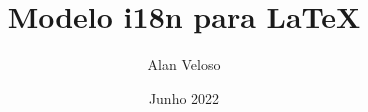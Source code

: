 \title{Modelo i18n para \LaTeX}
\author{Alan Veloso}
\date{Junho 2022}

\maketitle

\begin{abstract}
\lipsum[1-1]
\end{abstract}

